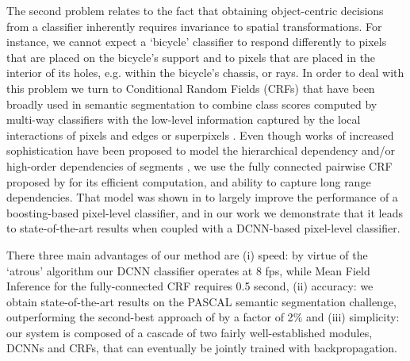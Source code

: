 The second problem relates to the fact that obtaining object-centric decisions
from a classifier inherently requires invariance to spatial
transformations. For instance, we cannot expect a `bicycle' classifier to
respond differently to pixels that are placed on the bicycle's support and to
pixels that are placed in the interior of its holes, e.g. within the bicycle's
chassis, or rays. In order to deal with this problem we turn to Conditional
Random Fields (CRFs) that have been broadly used in semantic segmentation to
combine class scores computed by multi-way classifiers with the low-level
information captured by the local interactions of pixels and edges
\citep{rother2004grabcut, shotton2009textonboost} or superpixels
\citep{lucchi2011spatial}. Even though works of increased sophistication have
been proposed to model the hierarchical dependency \citep{he2004multiscale,
  ladicky2009associative, lempitsky2011pylon} and/or high-order dependencies
of segments \citep{delong2012fast, gonfaus2010harmony, kohli2009robust}, we
use the fully connected pairwise CRF proposed by
\citet{krahenbuhl2011efficient} for its efficient computation, and ability to
capture long range dependencies. That model was shown in
\citet{krahenbuhl2011efficient} to largely improve the performance of a
boosting-based pixel-level classifier, and in our work we demonstrate that it
leads to state-of-the-art results when coupled with a DCNN-based pixel-level
classifier.


There  three main advantages of our method are (i) speed: by virtue of the `atrous' algorithm our DCNN classifier operates at 8 fps, while Mean Field Inference for the fully-connected CRF requires 0.5 second, (ii) accuracy: we obtain state-of-the-art results on the PASCAL semantic segmentation challenge, outperforming the second-best approach of \citet{mostajabi2014feedforward} by a factor of 2$\%$ and (iii) simplicity: our system is composed of a cascade of two fairly well-established modules, DCNNs and CRFs, that can eventually be jointly trained with backpropagation. 


